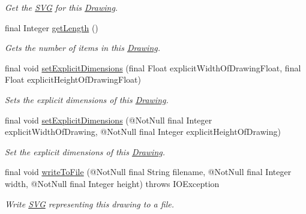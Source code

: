 \begin{DoxyCompactItemize}
\begin{DoxyCompactList}\small\item\em Get the \hyperlink{classcom_1_1aarrelaakso_1_1drawl_1_1_s_v_g}{S\+VG} for this \hyperlink{classcom_1_1aarrelaakso_1_1drawl_1_1_drawing}{Drawing}. \end{DoxyCompactList}\item 
final Integer \hyperlink{classcom_1_1aarrelaakso_1_1drawl_1_1_drawing_a3977c6a791f29d87eaad10771ed8eb80}{get\+Length} ()
\begin{DoxyCompactList}\small\item\em Gets the number of items in this \hyperlink{classcom_1_1aarrelaakso_1_1drawl_1_1_drawing}{Drawing}. \end{DoxyCompactList}\item 
final void \hyperlink{classcom_1_1aarrelaakso_1_1drawl_1_1_drawing_a4ac8a97ae89af08cf9ab01dbbe3dc010}{set\+Explicit\+Dimensions} (final Float explicit\+Width\+Of\+Drawing\+Float, final Float explicit\+Height\+Of\+Drawing\+Float)
\begin{DoxyCompactList}\small\item\em Sets the explicit dimensions of this \hyperlink{classcom_1_1aarrelaakso_1_1drawl_1_1_drawing}{Drawing}. \end{DoxyCompactList}\item 
final void \hyperlink{classcom_1_1aarrelaakso_1_1drawl_1_1_drawing_a79952c781df3b19936f0f47e2810951d}{set\+Explicit\+Dimensions} (@Not\+Null final Integer explicit\+Width\+Of\+Drawing, @Not\+Null final Integer explicit\+Height\+Of\+Drawing)
\begin{DoxyCompactList}\small\item\em Set the explicit dimensions of this \hyperlink{classcom_1_1aarrelaakso_1_1drawl_1_1_drawing}{Drawing}. \end{DoxyCompactList}\item 
final void \hyperlink{classcom_1_1aarrelaakso_1_1drawl_1_1_drawing_a3cf3359170b92a63cdcb5ab67a18562e}{write\+To\+File} (@Not\+Null final String filename, @Not\+Null final Integer width, @Not\+Null final Integer height)  throws I\+O\+Exception 
\begin{DoxyCompactList}\small\item\em Write \hyperlink{classcom_1_1aarrelaakso_1_1drawl_1_1_s_v_g}{S\+VG} representing this drawing to a file. \end{DoxyCompactList}\end{DoxyCompactItemize}
